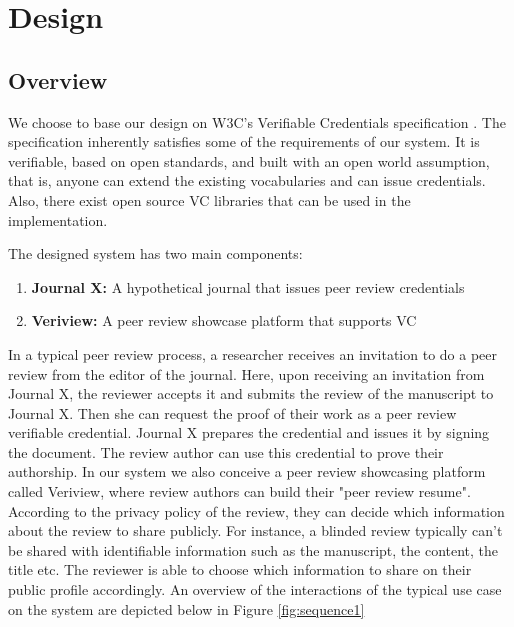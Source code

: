 \section{Design}




\subsection{Overview}

We choose to base our design on W3C's Verifiable Credentials specification \parencite{Sporny.18Kas2019}. The specification inherently satisfies some of the requirements of our system. It is verifiable, based on open standards, and built with an open world assumption, that is, anyone can extend the existing vocabularies and can issue credentials. Also, there exist open source \acrshort{VC} libraries that can be used in the implementation.

The designed system has two main components:

\begin{enumerate}
    \item \textbf{Journal X:} A hypothetical journal that issues peer review credentials
    \item \textbf{Veriview:} A peer review showcase platform that supports VC
\end{enumerate}


In a typical peer review process, a researcher receives an invitation to do a peer review from the editor of the journal. Here, upon receiving an invitation from Journal X, the reviewer accepts it and submits the review of the manuscript to Journal X. Then she can request the proof of their work as a peer review verifiable credential. Journal X prepares the credential and issues it by signing the document. The review author can use this credential to prove their authorship. In our system we also conceive a peer review showcasing platform called Veriview, where review authors can build their "peer review resume". According to the privacy policy of the review, they can decide which information about the review to share publicly. For instance, a blinded review typically can't be shared with identifiable information such as the manuscript, the content, the title etc. The reviewer is able to choose which information to share on their public profile accordingly. An overview of the interactions of the typical use case on the system are depicted below in Figure \ref{fig:sequence1} 

